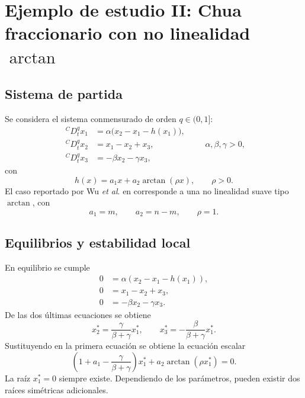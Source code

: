 \documentclass[journal]{IEEEtran}
\begin{document}
\section{Ejemplo de estudio II: Chua fraccionario con no linealidad \texorpdfstring{$\arctan$}{arctan}}
\label{sec:chua_arctan_frac}

\subsection{Sistema de partida}

Se considera el sistema conmensurado de orden $q\in(0,1]$:
\begin{equation}
\label{eq:arctan_system}
\begin{aligned}
{}^{C}D_t^q x_1 &= \alpha\bigl(x_2-x_1-h(x_1)\bigr),\\
{}^{C}D_t^q x_2 &= x_1-x_2+x_3,\\
{}^{C}D_t^q x_3 &= -\beta x_2-\gamma x_3,
\end{aligned}
\qquad \alpha,\beta,\gamma>0,
\end{equation}
con
\begin{equation}
\label{eq:h_arctan}
h(x)=a_1x+a_2\arctan(\rho x),
\qquad \rho>0.
\end{equation}
El caso reportado por Wu \emph{et al}. en \cite{Wu2023ArctanChua} corresponde a una no linealidad suave tipo $\arctan$, con
\begin{equation}
\label{eq:wu_mapping}
a_1=m,
\qquad
a_2=n-m,
\qquad
\rho=1.
\end{equation}

\subsection{Equilibrios y estabilidad local}

En equilibrio se cumple
\begin{equation}
\label{eq:equilibria_conditions_arctan}
\begin{aligned}
0&=\alpha(x_2-x_1-h(x_1)),\\
0&=x_1-x_2+x_3,\\
0&=-\beta x_2-\gamma x_3.
\end{aligned}
\end{equation}
De las dos últimas ecuaciones se obtiene
\begin{equation}
\label{eq:yz_equilibrio_arctan}
x_2^*=\frac{\gamma}{\beta+\gamma}x_1^*,
\qquad
x_3^*=-\frac{\beta}{\beta+\gamma}x_1^*.
\end{equation}
Sustituyendo en la primera ecuación se obtiene la ecuación escalar
\begin{equation}
\label{eq:equilibrio_escalar_arctan}
\left(1+a_1-\frac{\gamma}{\beta+\gamma}\right)x_1^*+a_2\arctan(\rho x_1^*)=0.
\end{equation}
La raíz $x_1^*=0$ siempre existe. Dependiendo de los parámetros, pueden existir dos raíces simétricas adicionales.
\end{document}
